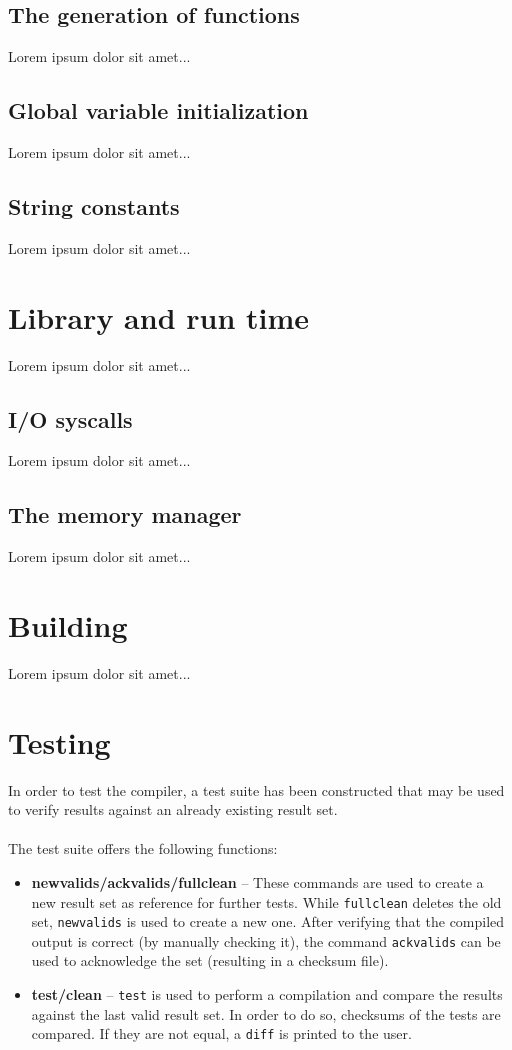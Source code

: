 \documentclass[a4paper]{report}
\begin{document}
    \section{The generation of functions}
      Lorem ipsum dolor sit amet...

    \section{Global variable initialization}
      Lorem ipsum dolor sit amet...

    \section{String constants}
      Lorem ipsum dolor sit amet...

  \chapter{Library and run time}
    Lorem ipsum dolor sit amet...

    \section{I/O syscalls}
      Lorem ipsum dolor sit amet...

    \section{The memory manager}
      Lorem ipsum dolor sit amet...
	
  \chapter{Building}
    Lorem ipsum dolor sit amet...

  \chapter{Testing}
    In order to test the compiler, a test suite has been constructed that may be used to verify results against an already existing result set. \\ \\
    The test suite offers the following functions:
    \begin{itemize}
      \item \textbf{newvalids/ackvalids/fullclean} -- These commands are used to create a new result set as reference for further tests. While \texttt{fullclean} deletes the old set, \texttt{newvalids} is used to create a new one. After verifying that the compiled output is correct (by manually checking it), the command \texttt{ackvalids} can be used to acknowledge the set (resulting in a checksum file). 
      \item \textbf{test/clean} -- \texttt{test} is used to perform a compilation and compare the results against the last valid result set. In order to do so, checksums of the tests are compared. If they are not equal, a \texttt{diff} is printed to the user.
    \end{itemize}

  
  
\end{document}
